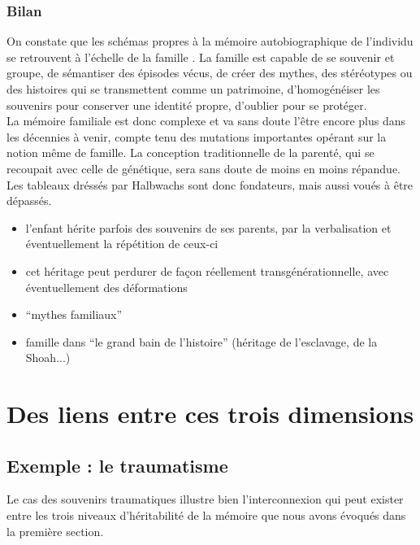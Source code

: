 \documentclass[french]{article}
\begin{document}
		\subsubsection{Bilan}
			On constate que les schémas propres à la mémoire autobiographique de l'individu se retrouvent à l'échelle de la famille \cite{kellermann2013}. La famille est capable de se souvenir et groupe, de sémantiser des épisodes vécus, de créer des mythes, des stéréotypes ou des histoires qui se transmettent comme un patrimoine, d'homogénéiser les souvenirs pour conserver une identité propre, d'oublier pour se protéger.\\
			La mémoire familiale est donc complexe et va sans doute l'être encore plus dans les décennies à venir, compte tenu des mutations importantes opérant sur la notion même de famille. La conception traditionnelle de la parenté, qui se recoupait avec celle de génétique, sera sans doute de moins en moins répandue. Les tableaux dréssés par Halbwachs sont donc fondateurs, mais aussi voués à être dépassés.
		
		
			
			
			
		\begin{itemize}
			\item l'enfant hérite parfois des souvenirs de ses parents, par la verbalisation et éventuellement la répétition de ceux-ci
			\item cet héritage peut perdurer de façon réellement transgénérationnelle, avec éventuellement des déformations
			\item ``mythes familiaux''
			\item famille dans ``le grand bain de l'histoire'' (héritage de l'esclavage, de la Shoah...)
		\end{itemize}
	\section{Des liens entre ces trois dimensions}
		\subsection{Exemple : le traumatisme}
			Le cas des souvenirs traumatiques illustre bien l'interconnexion qui peut exister entre les trois niveaux d'héritabilité de la mémoire que nous avons évoqués dans la première section.\\
			
\end{document}
